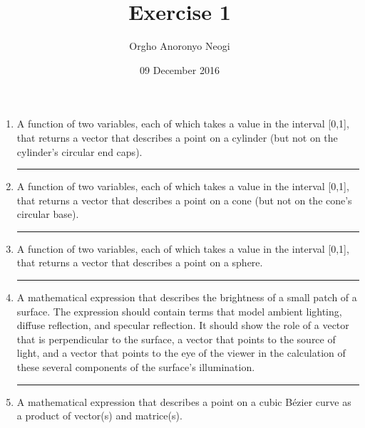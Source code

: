 \documentclass[oneside]{article}
\title{Exercise 1}
\author{Orgho Anoronyo Neogi}
\date{09 December 2016}
\newenvironment{answer}
  {\vspace*{0.2cm} \rule{12cm}{0.02cm} \vspace*{0.2cm}}
  {\vspace*{0.2cm}}
\begin{document}
\maketitle

\begin{enumerate}
	\item A function of two variables, each of which takes a value in the interval [0,1], that returns a vector that describes a point on a cylinder (but not on the cylinder's circular end caps).

	      \begin{answer}

	      \end{answer}

	\item A function of two variables, each of which takes a value in the interval [0,1], that returns a vector that describes a point on a cone (but not on the cone's circular base).

	      \begin{answer}

	      \end{answer}

	\item A function of two variables, each of which takes a value in the interval [0,1], that returns a vector that describes a point on a sphere.

	      \begin{answer}

	      \end{answer}

	\item A mathematical expression that describes the brightness of a small patch of a surface. The expression should contain terms that model ambient lighting, diffuse reflection, and specular reflection. It should show the role of a vector that is perpendicular to the surface, a vector that points to the source of light, and a vector that points to the eye of the viewer in the calculation of these several components of the surface's illumination.

	      \begin{answer}

	      \end{answer}

	\item A mathematical expression that describes a point on a cubic B\'{e}zier curve as a product of vector(s) and matrice(s).


\end{enumerate}
\end{document}
